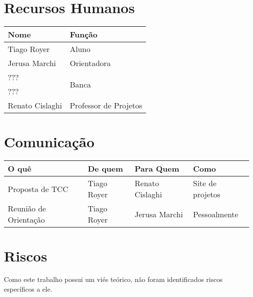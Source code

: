 \documentclass[12pt]{article}
\begin{document}
\section{Recursos Humanos}
    \begin{tabular}{l l}
        \hline
        Nome            & Função \\
        \hline
        Tiago Royer     & Aluno \\
        Jerusa Marchi   & Orientadora \\
        ???             & \multirow{2}{*}{Banca} \\
        ???             & \\
        Renato Cislaghi & Professor de Projetos \\
        \hline
    \end{tabular}

\section{Comunicação}
    \begin{tabular}{l l l l}
        \hline
        O quê                   & De quem       & Para Quem         & Como \\
        \hline
        Proposta de TCC         & Tiago Royer   & Renato Cislaghi   & Site de projetos \\
        Reunião de Orientação   & Tiago Royer   & Jerusa Marchi & Pessoalmente \\
        \hline
    \end{tabular}

\section{Riscos}
    Como este trabalho possui um viés teórico, não foram identificados
    riscos específicos a ele.



\end{document}
